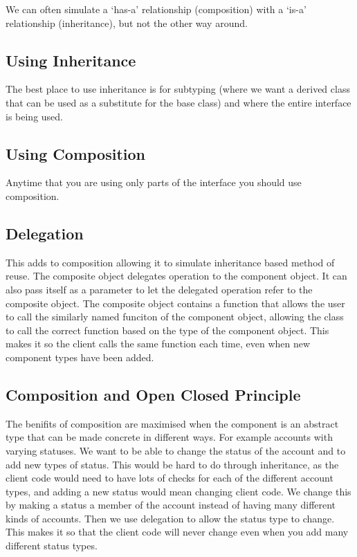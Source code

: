 \documentclass[12pt]{article}
\begin{document}
We can often simulate a `has-a' relationship (composition) with a `is-a' relationship (inheritance), but not the other way around.

\subsection{Using Inheritance}
The best place to use inheritance is for subtyping (where we want a derived class that can be used as a substitute for the base class) and where the entire interface is being used.

\subsection{Using Composition}
Anytime that you are using only parts of the interface you should use composition.

\subsection{Delegation}
This adds to composition allowing it to simulate inheritance based method of reuse. The composite object delegates operation to the component object. It can also pass itself as a parameter to let the delegated operation refer to the composite object. The composite object contains a function that allows the user to call the similarly named funciton of the component object, allowing the class to call the correct function based on the type of the component object. This makes it so the client calls the same function each time, even when new component types have been added.

\subsection{Composition and Open Closed Principle}
The benifits of composition are maximised when the component is an abstract type that can be made concrete in different ways. For example accounts with varying statuses. We want to be able to change the status of the account and to add new types of status. This would be hard to do through inheritance, as the client code would need to have lots of checks for each of the different account types, and adding a new status would mean changing client code. We change this by making a status a member of the account instead of having many different kinds of accounts. Then we use delegation to allow the status type to change. This makes it so that the client code will never change even when you add many different status types.
\end{document}
